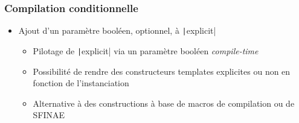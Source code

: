 \documentclass[C++.tex]{subfiles}
\begin{document}
\begin{frame}[fragile]
	\frametitle{Compilation conditionnelle}
	\begin{itemize}
		\item Ajout d'un paramètre booléen, optionnel, à \texttt|explicit|
		\begin{itemize}
			\item Pilotage de \texttt|explicit| via un paramètre booléen \textit{compile-time}
			\item Possibilité de rendre des constructeurs templates explicites ou non en fonction de l'instanciation
			\item Alternative à des constructions à base de macros de compilation ou de SFINAE
		\end{itemize}
	\end{itemize}
\end{frame}
\end{document}
